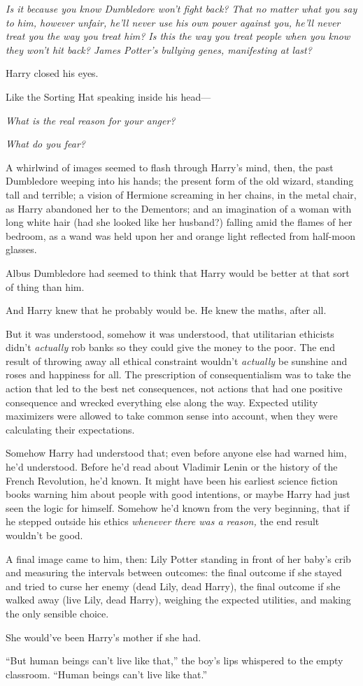 \emph{Is it because you know Dumbledore won’t fight back? That no matter what you say to him, however unfair, he’ll never use his own power against you, he’ll never treat you the way you treat him? Is this the way you treat people when you know they won’t hit back? James Potter’s bullying genes, manifesting at last?}

Harry closed his eyes.

Like the Sorting Hat speaking inside his head—

\emph{What is the real reason for your anger?}

\emph{What do you fear?}

A whirlwind of images seemed to flash through Harry’s mind, then, the past Dumbledore weeping into his hands; the present form of the old wizard, standing tall and terrible; a vision of Hermione screaming in her chains, in the metal chair, as Harry abandoned her to the Dementors; and an imagination of a woman with long white hair (had she looked like her husband?) falling amid the flames of her bedroom, as a wand was held upon her and orange light reflected from half-moon glasses.

Albus Dumbledore had seemed to think that Harry would be better at that sort of thing than him.

And Harry knew that he probably would be. He knew the maths, after all.

But it was understood, somehow it was understood, that utilitarian ethicists didn’t \emph{actually} rob banks so they could give the money to the poor. The end result of throwing away all ethical constraint wouldn’t \emph{actually} be sunshine and roses and happiness for all. The prescription of consequentialism was to take the action that led to the best net consequences, not actions that had one positive consequence and wrecked everything else along the way. Expected utility maximizers were allowed to take common sense into account, when they were calculating their expectations.

Somehow Harry had understood that; even before anyone else had warned him, he’d understood. Before he’d read about Vladimir Lenin or the history of the French Revolution, he’d known. It might have been his earliest science fiction books warning him about people with good intentions, or maybe Harry had just seen the logic for himself. Somehow he’d known from the very beginning, that if he stepped outside his ethics \emph{whenever there was a reason,} the end result wouldn’t be good.

A final image came to him, then: Lily Potter standing in front of her baby’s crib and measuring the intervals between outcomes: the final outcome if she stayed and tried to curse her enemy (dead Lily, dead Harry), the final outcome if she walked away (live Lily, dead Harry), weighing the expected utilities, and making the only sensible choice.

She would’ve been Harry’s mother if she had.

“But human beings can’t live like that,” the boy’s lips whispered to the empty classroom. “Human beings can’t live like that.”

